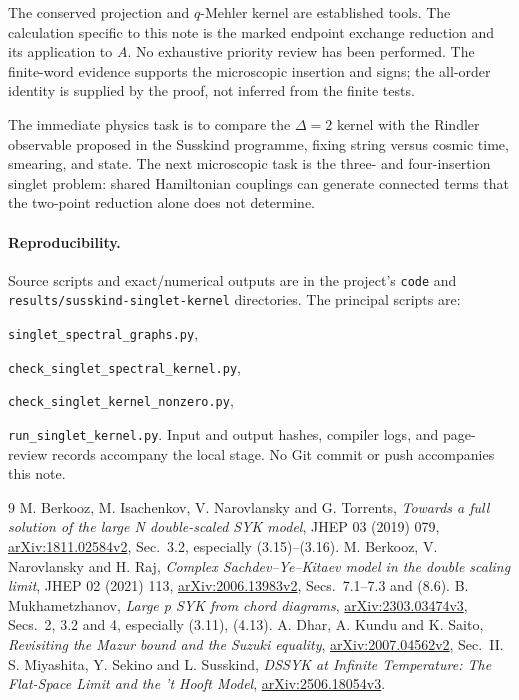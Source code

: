 \documentclass[11pt,a4paper]{article}
\begin{document}
The conserved projection and $q$-Mehler kernel are established tools.
The calculation specific to this note is the marked endpoint exchange
reduction and its application to $A$. No exhaustive priority review
has been performed. The finite-word evidence supports the microscopic
insertion and signs; the all-order identity is supplied by the proof,
not inferred from the finite tests.

The immediate physics task is to compare the $\Delta=2$ kernel with
the Rindler observable proposed in the Susskind
programme, fixing string versus cosmic time, smearing, and state.
The next microscopic task is the three- and four-insertion singlet
problem: shared Hamiltonian couplings can generate connected terms
that the two-point reduction alone does not determine.

\paragraph{Reproducibility.}
Source scripts and exact/numerical outputs are in the project's
\texttt{code} and \texttt{results/susskind-singlet-kernel} directories.
The principal scripts are:\par
\texttt{singlet\_spectral\_graphs.py},\par
\texttt{check\_singlet\_spectral\_kernel.py},\par
\texttt{check\_singlet\_kernel\_nonzero.py},\par
\texttt{run\_singlet\_kernel.py}.
Input and output hashes, compiler logs, and page-review records accompany
the local stage. No Git commit or push accompanies this note.

\begin{thebibliography}{9}
 M. Berkooz, M. Isachenkov, V. Narovlansky and G. Torrents,
\emph{Towards a full solution of the large N double-scaled SYK model},
JHEP 03 (2019) 079, \href{https://arxiv.org/abs/1811.02584v2}{arXiv:1811.02584v2},
Sec.~3.2, especially (3.15)--(3.16).
 M. Berkooz, V. Narovlansky and H. Raj,
\emph{Complex Sachdev--Ye--Kitaev model in the double scaling limit},
JHEP 02 (2021) 113, \href{https://arxiv.org/abs/2006.13983v2}{arXiv:2006.13983v2},
Secs.~7.1--7.3 and (8.6).
 B. Mukhametzhanov, \emph{Large p SYK from chord diagrams},
\href{https://arxiv.org/abs/2303.03474v3}{arXiv:2303.03474v3},
Secs.~2, 3.2 and 4, especially (3.11), (4.13).
 A. Dhar, A. Kundu and K. Saito,
\emph{Revisiting the Mazur bound and the Suzuki equality},
\href{https://arxiv.org/abs/2007.04562v2}{arXiv:2007.04562v2}, Sec.~II.
 S. Miyashita, Y. Sekino and L. Susskind,
\emph{DSSYK at Infinite Temperature: The Flat-Space Limit and the
't Hooft Model},
\href{https://arxiv.org/abs/2506.18054v3}{arXiv:2506.18054v3}.
\end{thebibliography}
\end{document}

